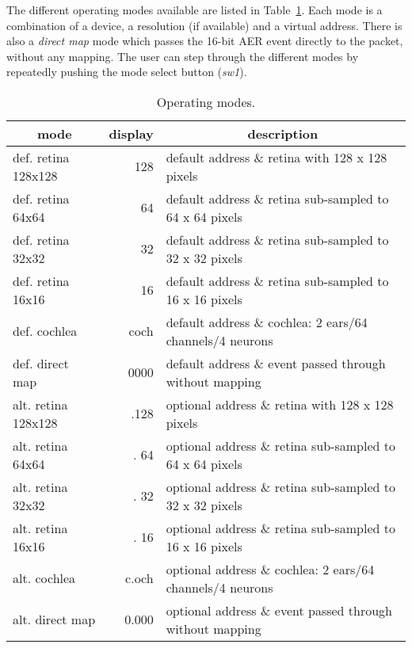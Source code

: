 The different operating modes available are listed in Table~\ref{tab:modes}. Each mode is a combination of a device, a resolution (if available) and a virtual address. There is also a \emph{direct map} mode which passes the 16-bit AER event directly to the packet, without any mapping. The user can step through the different modes by repeatedly pushing the mode select button (\emph{sw1}).\\


\begin{table}[!hp]
\begin{center}
\begin{tabular}{| l | r | l |}
\hline
\multicolumn{1}{|c}{mode}  & \multicolumn{1}{|c|}{display} & \multicolumn{1}{|c|}{description} \\
\hline
def. retina 128x128  &  128    & default address \& retina with 128 x 128 pixels \\
def. retina  64x64   &   64    & default address \& retina sub-sampled to 64 x 64 pixels \\
def. retina  32x32   &   32    & default address \& retina sub-sampled to 32 x 32 pixels \\
def. retina  16x16   &   16    & default address \& retina sub-sampled to 16 x 16 pixels \\
\hline
def. cochlea         & coch    & default address \& cochlea: 2 ears/64 channels/4 neurons\\
\hline
def. direct map      & 0000    & default address \& event passed through without mapping \\
\hline
alt. retina 128x128  & .128    & optional address \& retina with 128 x 128 pixels \\
alt. retina  64x64   & . 64    & optional address \& retina sub-sampled to 64 x 64 pixels \\
alt. retina  32x32   & . 32    & optional address \& retina sub-sampled to 32 x 32 pixels \\
alt. retina  16x16   & . 16    & optional address \& retina sub-sampled to 16 x 16 pixels \\
\hline
alt. cochlea         & c.och   & optional address \& cochlea: 2 ears/64 channels/4 neurons\\
\hline
alt. direct map      & 0.000   & optional address \& event passed through without mapping \\
\hline
\end{tabular}
\caption{Operating modes.}
\label{tab:modes}
\end{center}
\end{table}


